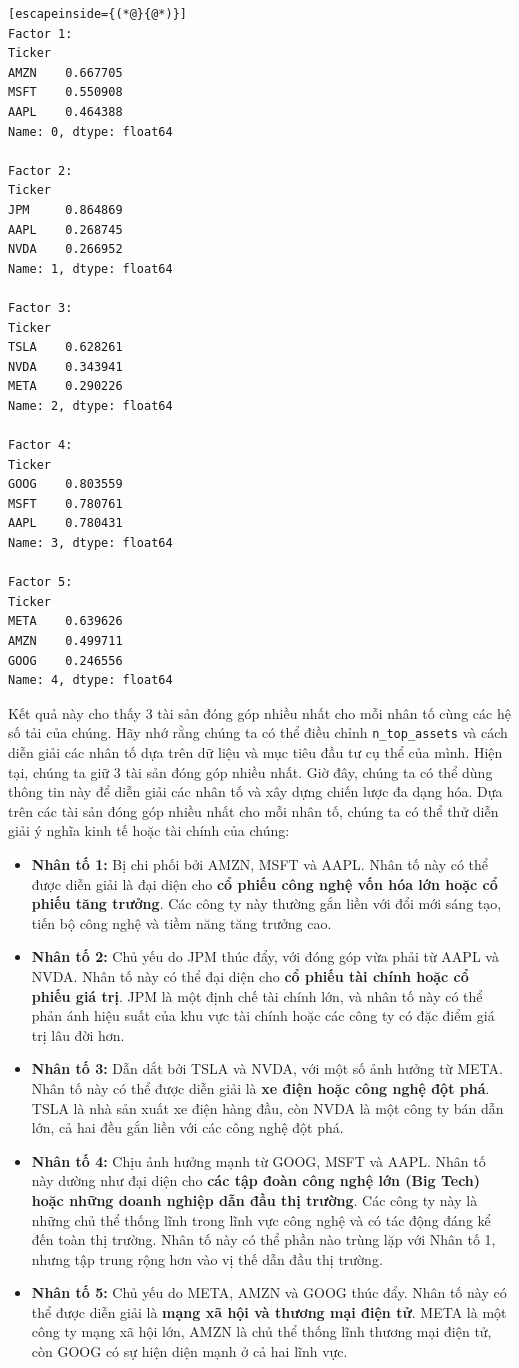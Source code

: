 \begin{lstlisting}[escapeinside={(*@}{@*)}]
Factor 1:
Ticker
AMZN    0.667705
MSFT    0.550908
AAPL    0.464388
Name: 0, dtype: float64

Factor 2:
Ticker
JPM     0.864869
AAPL    0.268745
NVDA    0.266952
Name: 1, dtype: float64

Factor 3:
Ticker
TSLA    0.628261
NVDA    0.343941
META    0.290226
Name: 2, dtype: float64

Factor 4:
Ticker
GOOG    0.803559
MSFT    0.780761
AAPL    0.780431
Name: 3, dtype: float64

Factor 5:
Ticker
META    0.639626
AMZN    0.499711
GOOG    0.246556
Name: 4, dtype: float64
\end{lstlisting}

Kết quả này cho thấy 3 tài sản đóng góp nhiều nhất cho mỗi nhân tố cùng các hệ số tải của chúng. Hãy nhớ rằng chúng ta có thể điều chỉnh \texttt{n\_top\_assets} và cách diễn giải các nhân tố dựa trên dữ liệu và mục tiêu đầu tư cụ thể của mình. Hiện tại, chúng ta giữ 3 tài sản đóng góp nhiều nhất. Giờ đây, chúng ta có thể dùng thông tin này để diễn giải các nhân tố và xây dựng chiến lược đa dạng hóa. Dựa trên các tài sản đóng góp nhiều nhất cho mỗi nhân tố, chúng ta có thể thử diễn giải ý nghĩa kinh tế hoặc tài chính của chúng:

\begin{itemize}
\item
  \textbf{Nhân tố 1:} Bị chi phối bởi AMZN, MSFT và AAPL. Nhân tố này có thể được diễn giải là đại diện cho \textbf{cổ phiếu công nghệ vốn hóa lớn hoặc cổ phiếu tăng trưởng}. Các công ty này thường gắn liền với đổi mới sáng tạo, tiến bộ công nghệ và tiềm năng tăng trưởng cao.
\item
  \textbf{Nhân tố 2:} Chủ yếu do JPM thúc đẩy, với đóng góp vừa phải từ AAPL và NVDA. Nhân tố này có thể đại diện cho \textbf{cổ phiếu tài chính hoặc cổ phiếu giá trị}. JPM là một định chế tài chính lớn, và nhân tố này có thể phản ánh hiệu suất của khu vực tài chính hoặc các công ty có đặc điểm giá trị lâu đời hơn.
\item
  \textbf{Nhân tố 3:} Dẫn dắt bởi TSLA và NVDA, với một số ảnh hưởng từ META. Nhân tố này có thể được diễn giải là \textbf{xe điện hoặc công nghệ đột phá}. TSLA là nhà sản xuất xe điện hàng đầu, còn NVDA là một công ty bán dẫn lớn, cả hai đều gắn liền với các công nghệ đột phá.
\item
  \textbf{Nhân tố 4:} Chịu ảnh hưởng mạnh từ GOOG, MSFT và AAPL. Nhân tố này dường như đại diện cho \textbf{các tập đoàn công nghệ lớn (Big Tech) hoặc những doanh nghiệp dẫn đầu thị trường}. Các công ty này là những chủ thể thống lĩnh trong lĩnh vực công nghệ và có tác động đáng kể đến toàn thị trường. Nhân tố này có thể phần nào trùng lặp với Nhân tố 1, nhưng tập trung rộng hơn vào vị thế dẫn đầu thị trường.
\item
  \textbf{Nhân tố 5:} Chủ yếu do META, AMZN và GOOG thúc đẩy. Nhân tố này có thể được diễn giải là \textbf{mạng xã hội và thương mại điện tử}. META là một công ty mạng xã hội lớn, AMZN là chủ thể thống lĩnh thương mại điện tử, còn GOOG có sự hiện diện mạnh ở cả hai lĩnh vực.
\end{itemize}

